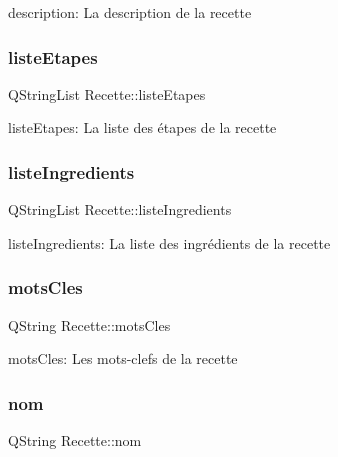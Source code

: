 description\+: La description de la recette \mbox{\label{classRecette_addbf40a642849e6583ac7fd3e2059e0d}} 
\subsubsection{\texorpdfstring{liste\+Etapes}{listeEtapes}}
{\footnotesize\ttfamily Q\+String\+List Recette\+::liste\+Etapes\hspace{0.3cm}{\ttfamily [private]}}

liste\+Etapes\+: La liste des étapes de la recette \mbox{\label{classRecette_ab90a69f52a2250e1f49c4ac52b364adf}} 
\subsubsection{\texorpdfstring{liste\+Ingredients}{listeIngredients}}
{\footnotesize\ttfamily Q\+String\+List Recette\+::liste\+Ingredients\hspace{0.3cm}{\ttfamily [private]}}

liste\+Ingredients\+: La liste des ingrédients de la recette \mbox{\label{classRecette_ad17f7e5b745e0b01932acb6d6ff58dd6}} 
\subsubsection{\texorpdfstring{mots\+Cles}{motsCles}}
{\footnotesize\ttfamily Q\+String Recette\+::mots\+Cles\hspace{0.3cm}{\ttfamily [private]}}

mots\+Cles\+: Les mots-\/clefs de la recette \mbox{\label{classRecette_a8923b8c64bab1afaa4595442bc7b5803}} 
\subsubsection{\texorpdfstring{nom}{nom}}
{\footnotesize\ttfamily Q\+String Recette\+::nom\hspace{0.3cm}{\ttfamily [private]}}

